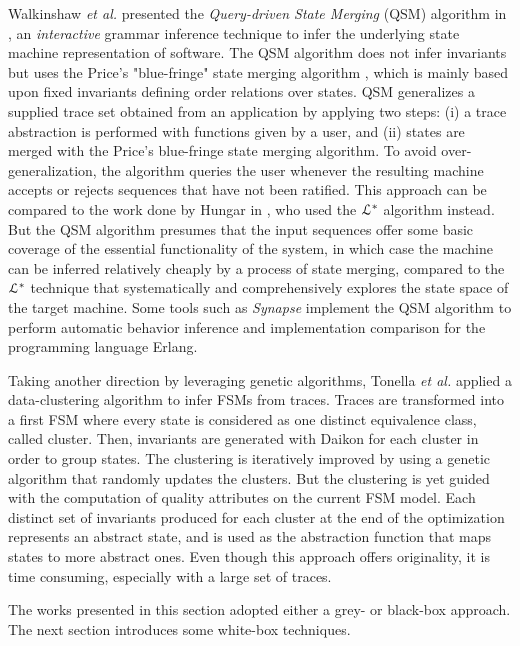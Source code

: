 Walkinshaw \emph{et al.} presented the \textit{Query-driven State
Merging} (QSM) algorithm in
\cite{Walkinshaw07reverseengineering}, an \textit{interactive}
grammar inference technique to infer the underlying state machine
representation of software. The QSM algorithm does not infer
invariants but uses the Price's "blue-fringe" state merging
algorithm \cite{Lang:1998:RAO:645517.655780}, which is mainly
based upon fixed invariants defining order relations over states.
QSM generalizes a supplied trace set obtained from an application
by applying two steps: (i) a trace abstraction is performed
with functions given by a user, and (ii) states are merged with
the Price's blue-fringe state merging algorithm. To avoid
over-generalization, the algorithm queries the user whenever the
resulting machine accepts or rejects sequences that have not
been ratified. This approach can be compared to the work done by
Hungar in \cite{hungar}, who used the $\EuScript{L}^*$ algorithm
instead. But the QSM algorithm presumes that the input sequences
offer some basic coverage of the essential functionality of the
system, in which case the machine can be inferred relatively
cheaply by a process of state merging, compared to the
$\EuScript{L}^*$ technique that systematically and
comprehensively explores the state space of the target machine.
Some tools such as \textit{Synapse}
\cite{LamelaSeijas:2014:SAB:2633448.2633457} implement the QSM
algorithm to perform automatic behavior inference and
implementation comparison for the programming language Erlang.

Taking another direction by leveraging genetic algorithms,
Tonella \emph{et al.} \cite{TonellaNMLH13} applied a data-clustering
algorithm to infer FSMs from traces. Traces are transformed into a
first FSM where every state is considered as one distinct
equivalence class, called cluster. Then, invariants are generated
with Daikon for each cluster in order to group states. The
clustering is iteratively improved by using a genetic algorithm
that randomly updates the clusters. But the clustering is yet
guided with the computation of quality attributes on the current
FSM model. Each distinct set of invariants produced for each
cluster at the end of the optimization represents an abstract
state, and is used as the abstraction function that maps states
to more abstract ones. Even though this approach offers
originality, it is time consuming, especially with a large set of
traces.

The works presented in this section adopted either a grey- or
black-box approach. The next section introduces some white-box
techniques.

